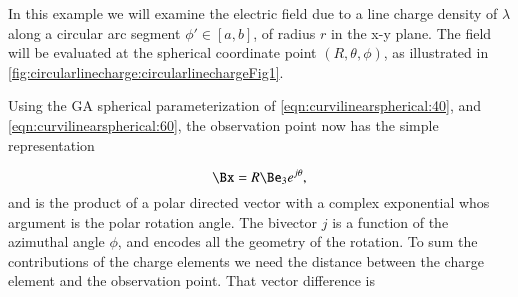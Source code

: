 %
%
In this example we will examine the electric field due to a line charge density of \( \lambda \) along a circular arc segment \( \phi' \in [a,b] \), of radius \( r \) in the x-y plane.
The field will be evaluated at the
spherical coordinate point \( (R, \theta, \phi) \), as illustrated in \cref{fig:circularlinecharge:circularlinechargeFig1}.


Using the GA spherical parameterization of \cref{eqn:curvilinearspherical:40}, and \cref{eqn:curvilinearspherical:60}, the
%
%
%
%
observation point now has the simple representation

\begin{dmath}\label{eqn:circularlinecharge:60}
\Bx = R \Be_3 e^{j \theta },
\end{dmath}
and is the product of a polar directed vector with a complex exponential whos argument is the polar rotation angle.
The bivector \( j \) is a function of the azimuthal angle \( \phi \), and encodes all the geometry of the rotation.
To sum the contributions of the charge elements we need the distance between the charge element and the observation point.
That vector difference is

